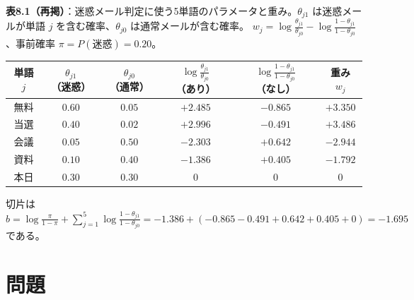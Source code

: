 \documentclass[a4paper,dvipdfmx]{jsarticle}
\newcommand{\提出期限}{2026年11月16日（月）}
\newcommand{\学籍番号}{0000000}
\newcommand{\氏名}{氏名を書く}
\newcommand{\提出日}{2026年11月16日}
\begin{document}
\vspace{2mm}
\noindent
\textbf{表8.1（再掲）}：迷惑メール判定に使う5単語のパラメータと重み。$\theta_{j1}$ は迷惑メールが単語 $j$ を含む確率、$\theta_{j0}$ は通常メールが含む確率。
$w_j = \log\frac{\theta_{j1}}{\theta_{j0}} - \log\frac{1 - \theta_{j1}}{1 - \theta_{j0}}$、事前確率 $\pi = P(\text{迷惑}) = 0.20$。
\begin{center}
  \begin{tabular}{c|cc|cc|c}
    \hline
    単語 $j$ & $\theta_{j1}$（迷惑） & $\theta_{j0}$（通常） & $\log\frac{\theta_{j1}}{\theta_{j0}}$（あり） & $\log\frac{1 - \theta_{j1}}{1 - \theta_{j0}}$（なし） & 重み $w_j$ \\
    \hline\hline
    無料 & $0.60$ & $0.05$ & $+2.485$ & $-0.865$ & $+3.350$ \\
    当選 & $0.40$ & $0.02$ & $+2.996$ & $-0.491$ & $+3.486$ \\
    会議 & $0.05$ & $0.50$ & $-2.303$ & $+0.642$ & $-2.944$ \\
    資料 & $0.10$ & $0.40$ & $-1.386$ & $+0.405$ & $-1.792$ \\
    本日 & $0.30$ & $0.30$ & $0$ & $0$ & $0$ \\
    \hline
  \end{tabular}
\end{center}
切片は $b = \log\frac{\pi}{1 - \pi} + \sum_{j=1}^5 \log\frac{1 - \theta_{j1}}{1 - \theta_{j0}} = -1.386 + (-0.865 - 0.491 + 0.642 + 0.405 + 0) = -1.695$ である。

\section*{問題}
\end{document}
